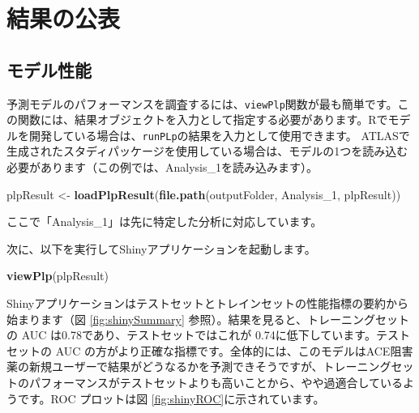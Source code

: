 \documentclass[
  11pt]{book}
\newenvironment{Shaded}{\begin{snugshade}}{\end{snugshade}}
\newcommand{\FunctionTok}[1]{\textcolor[rgb]{0.13,0.29,0.53}{\textbf{#1}}}
\newcommand{\NormalTok}[1]{#1}
\newcommand{\OtherTok}[1]{\textcolor[rgb]{0.56,0.35,0.01}{#1}}
\newcommand{\StringTok}[1]{\textcolor[rgb]{0.31,0.60,0.02}{#1}}
\theoremstyle{definition}
\theoremstyle{definition}
\theoremstyle{definition}
\theoremstyle{definition}
\theoremstyle{remark}
\begin{document}
\section{結果の公表}\label{ux7d50ux679cux306eux516cux8868}

\subsection{モデル性能}\label{ux30e2ux30c7ux30ebux6027ux80fd}

予測モデルのパフォーマンスを調査するには、\texttt{viewPlp}関数が最も簡単です。この関数には、結果オブジェクトを入力として指定する必要があります。Rでモデルを開発している場合は、\texttt{runPLp}の結果を入力として使用できます。 ATLASで生成されたスタディパッケージを使用している場合は、モデルの1つを読み込む必要があります（この例では、Analysis\_1を読み込みます）。

\begin{Shaded}
\begin{Highlighting}[]
\NormalTok{plpResult }\OtherTok{\textless{}{-}} \FunctionTok{loadPlpResult}\NormalTok{(}\FunctionTok{file.path}\NormalTok{(outputFolder,}
                                     \StringTok{\textquotesingle{}Analysis\_1\textquotesingle{}}\NormalTok{,}
                                     \StringTok{\textquotesingle{}plpResult\textquotesingle{}}\NormalTok{))}
\end{Highlighting}
\end{Shaded}

ここで「Analysis\_1」は先に特定した分析に対応しています。

次に、以下を実行してShinyアプリケーションを起動します。

\begin{Shaded}
\begin{Highlighting}[]
\FunctionTok{viewPlp}\NormalTok{(plpResult)}
\end{Highlighting}
\end{Shaded}

Shinyアプリケーションはテストセットとトレインセットの性能指標の要約から始まります（図 \ref{fig:shinySummary} 参照）。結果を見ると、トレーニングセットの AUC は0.78であり、テストセットではこれが 0.74に低下しています。テストセットの AUC の方がより正確な指標です。全体的には、このモデルはACE阻害薬の新規ユーザーで結果がどうなるかを予測できそうですが、トレーニングセットのパフォーマンスがテストセットよりも高いことから、やや過適合しているようです。ROC プロットは図 \ref{fig:shinyROC}に示されています。
\end{document}
